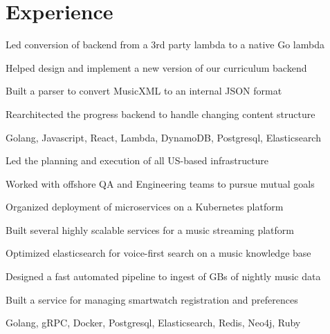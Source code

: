 \documentclass[]{modern}
\begin{document}
\begin{minipage}[t]{0.66\textwidth}


\section{Experience}


\vspace{\topsep} %
\begin{tightemize}
\item Led conversion of backend from a 3rd party lambda to a native Go lambda
\item Helped design and implement a new version of our curriculum backend
\item Built a parser to convert MusicXML to an internal JSON format
\item Rearchitected the progress backend to handle changing content structure
\item Golang, Javascript, React, Lambda, DynamoDB, Postgresql, Elasticsearch
\end{tightemize}
\sectionsep


\begin{tightemize}
\item Led the planning and execution of all US-based infrastructure
\item Worked with offshore QA and Engineering teams to pursue mutual goals
\item Organized deployment of microservices on a Kubernetes platform
\end{tightemize}
\sectionsep


\begin{tightemize}
\item Built several highly scalable services for a music streaming platform
\item Optimized elasticsearch for voice-first search on a music knowledge base
\item Designed a fast automated pipeline to ingest of GBs of nightly music data
\item Built a service for managing smartwatch registration and preferences
\item Golang, gRPC, Docker, Postgresql, Elasticsearch, Redis, Neo4j, Ruby
\end{tightemize}
\sectionsep


\end{minipage}
\end{document}
